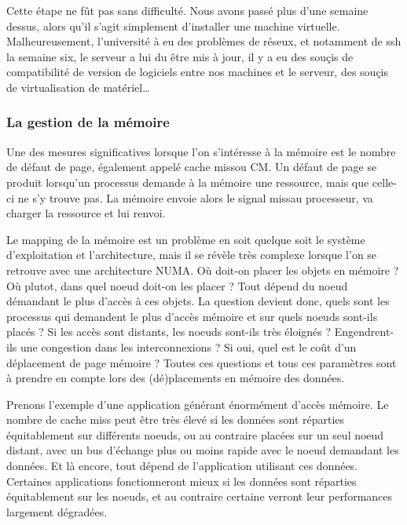     Cette étape ne fût pas sans difficulté. Nous avons passé plus d'une semaine
    dessus, alors qu'il s'agit simplement d'installer une machine
    virtuelle. Malheureusement, l'université à eu des problèmes de réseux, et
    notamment de ssh la semaine six, le serveur a lui du être mis à jour, il y a
    eu des souçis de compatibilité de version de logiciels entre nos machines et
    le serveur, des souçis de virtualisation de matériel\ldots


  \subsubsection{La gestion de la mémoire}
  
    Une des mesures significatives lorsque l'on s'intéresse à la mémoire est le
    nombre de défaut de page, également appelé \og cache miss\fg ou \og CM\fg. Un
    défaut de page se produit lorsqu'un processus demande à la mémoire une
    ressource, mais que celle-ci ne s'y trouve pas. La mémoire envoie alors le signal
    \og miss\fg au processeur, va charger la ressource et lui renvoi.

    Le mapping de la mémoire est un problème en soit quelque soit le système
    d'exploitation et l'architecture, mais il se révèle très complexe lorsque
    l'on se retrouve avec une architecture NUMA. Où doit-on placer les objets en
    mémoire ? Où plutot, dans quel noeud doit-on les placer ? Tout dépend du
    noeud démandant le plus d'accès à ces objets. La question devient donc,
    quels sont les processus qui demandent le plus d'accès mémoire et sur quels
    noeuds sont-ils placés ? Si les accès sont distants, les noeuds sont-ils
    très éloignés ? Engendrent-ils une congestion dans les interconnexions ? Si
    oui, quel est le coût d'un déplacement de page mémoire ?  Toutes ces
    questions et tous ces paramètres sont à prendre en compte lors des
    (dé)placements en mémoire des données.

    Prenons l'exemple d'une application générant énormément d'accès mémoire. Le
    nombre de cache miss peut être très élevé si les données sont réparties
    équitablement sur différents noeuds, ou au contraire placées sur un seul
    noeud distant, avec un bus d'échange plus ou moins rapide avec le noeud
    demandant les données. Et là encore, tout dépend de l'application utilisant
    ces données. Certaines applications fonctionneront mieux si les données sont
    réparties équitablement sur les noeuds, et au contraire certaine verront
    leur performances largement dégradées.


